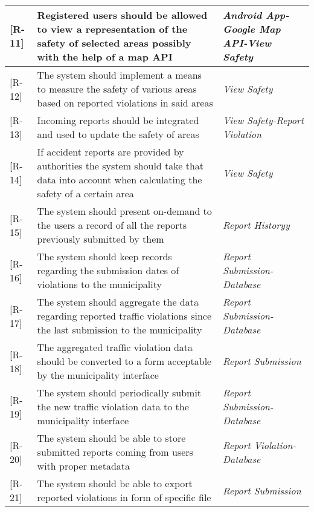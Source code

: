 \begin{longtable}{| p{} |p{} | p{} |}
 [R-11] &  Registered users should be allowed to view a representation of the safety of selected areas possibly with the help of a map API & \emph{Android App-Google Map API-View Safety} 		\\ \hline

 [R-12] & The system should implement a means to measure the safety of various areas based on reported violations in said areas & \emph{View Safety} 		\\ \hline

 [R-13] & Incoming reports should be integrated and used to update the safety of areas & \emph{View Safety-Report Violation} 		\\ \hline

 [R-14] & If accident reports are provided by authorities the system should take that data into account when calculating the safety of a certain area & \emph{View Safety} 		\\ \hline

 [R-15] &  The system should present on-demand to the users a record of all the reports previously submitted by them & \emph{Report Historyy} 		\\ \hline

 [R-16] & The system should keep records regarding the submission dates of violations to the municipality & \emph{Report Submission-Database} 		\\ \hline

 [R-17] & The system should aggregate the data regarding reported traffic violations since the last submission to the municipality & \emph{Report Submission-Database} 		\\ \hline

 [R-18] & The aggregated traffic violation data should be converted to a form acceptable by the municipality interface & \emph{Report Submission} 		\\ \hline

 [R-19] & The system should periodically submit the new traffic violation data to the municipality
interface & \emph{Report Submission-Database} 		\\ \hline

 [R-20] & The system should be able to store submitted reports coming from users with proper metadata & \emph{Report Violation-Database} 		\\ \hline

 [R-21] & The system should be able to export reported violations in form of specific file & \emph{Report Submission} 		\\ \hline


\end{longtable}
